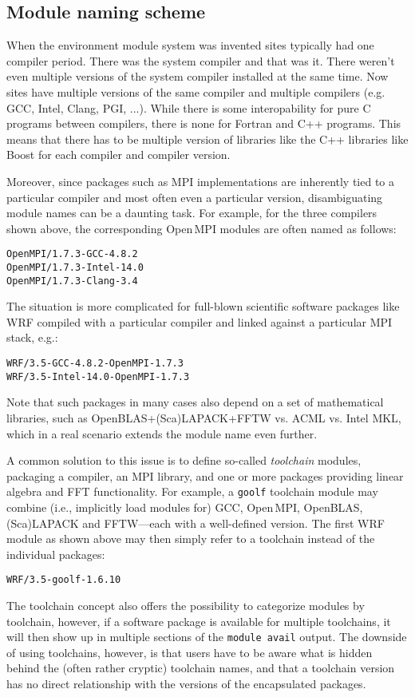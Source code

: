 \subsection{Module naming scheme}
\label{sec:Module_naming_scheme}
When the environment module system was invented sites typically had
one compiler period.  There was the system compiler and that was it.
There weren't even multiple versions of the system compiler installed
at the same time.  Now sites have multiple versions of the same
compiler and multiple compilers (e.g. GCC, Intel, Clang, PGI, ...).
While there is some interopability for pure C programs between
compilers, there is none for Fortran and C++ programs.  This means
that there has to be multiple version of libraries like the C++
libraries like Boost for each compiler and compiler version.

Moreover, since packages such as MPI implementations are inherently tied to a
particular compiler and most often even a particular version, disambiguating
module names can be a daunting task. For example, for the three compilers
shown above, the corresponding Open\,MPI modules are often named as follows:
{\small
\begin{alltt}
    OpenMPI/1.7.3-GCC-4.8.2
    OpenMPI/1.7.3-Intel-14.0
    OpenMPI/1.7.3-Clang-3.4
\end{alltt}
}

The situation is more complicated for full-blown scientific software
packages like WRF compiled with a particular compiler and linked
against a particular MPI stack, e.g.:
{\small
\begin{alltt}
    WRF/3.5-GCC-4.8.2-OpenMPI-1.7.3
    WRF/3.5-Intel-14.0-OpenMPI-1.7.3
\end{alltt}
}
\noindent
Note that such packages in many cases also depend on a set of mathematical
libraries, such as OpenBLAS+(Sca)LAPACK+FFTW vs. ACML vs. Intel MKL, which in a
real scenario extends the module name even further.

A common solution to this issue is to define so-called \emph{toolchain}
modules, packaging a compiler, an MPI library, and one or more packages
providing linear algebra and FFT functionality. For example, a \texttt{goolf}
toolchain module may combine (i.e., implicitly load modules for) GCC,
Open\,MPI, OpenBLAS, (Sca)LAPACK and FFTW---each with a well-defined version. The
first WRF module as shown above may then simply refer to a toolchain instead of the
individual packages:
{\small
\begin{alltt}
    WRF/3.5-goolf-1.6.10
\end{alltt}
}
The toolchain concept also offers the possibility to categorize modules by
toolchain, however, if a software package is available for multiple
toolchains, it will then show up in multiple sections of the \texttt{module
avail} output. The downside of using toolchains, however, is that users have
to be aware what is hidden behind the (often rather cryptic) toolchain names,
and that a toolchain version has no direct relationship with the versions of
the encapsulated packages.

